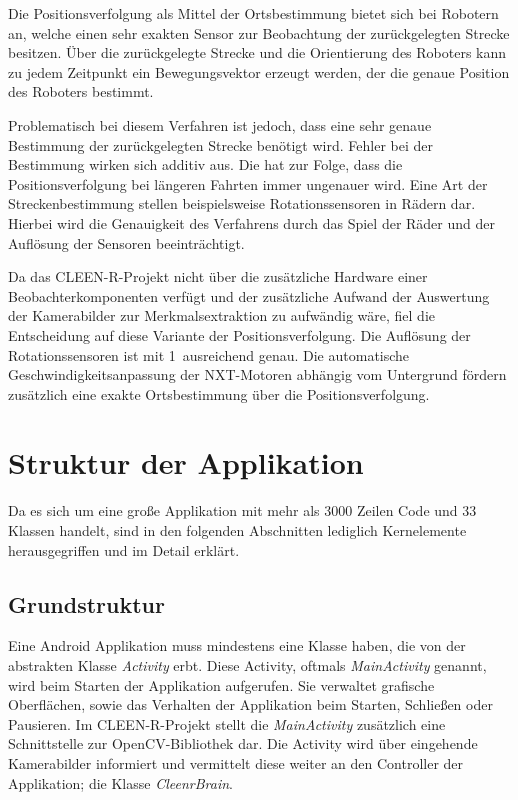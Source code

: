 Die Positionsverfolgung als Mittel der Ortsbestimmung bietet sich bei Robotern an, welche einen sehr exakten Sensor zur Beobachtung der zurückgelegten Strecke besitzen. Über die zurückgelegte Strecke und die Orientierung des Roboters kann zu jedem Zeitpunkt ein Bewegungsvektor erzeugt werden, der die genaue Position des Roboters bestimmt.

Problematisch bei diesem Verfahren ist jedoch, dass eine sehr genaue Bestimmung der zurückgelegten Strecke benötigt wird. Fehler bei der Bestimmung wirken sich additiv aus. Die hat zur Folge, dass die Positionsverfolgung bei längeren Fahrten immer ungenauer wird. Eine Art der Streckenbestimmung stellen beispielsweise Rotationssensoren in Rädern dar. Hierbei wird die Genauigkeit des Verfahrens durch das Spiel der Räder und der Auflösung der Sensoren beeinträchtigt.

Da das CLEEN-R-Projekt nicht über die zusätzliche Hardware einer Beobachterkomponenten verfügt und der zusätzliche Aufwand der Auswertung der Kamerabilder zur Merkmalsextraktion zu aufwändig wäre, fiel die Entscheidung auf diese Variante der Positionsverfolgung. Die Auflösung der Rotationssensoren ist mit 1\degree\ ausreichend genau. Die automatische Geschwindigkeitsanpassung der NXT-Motoren abhängig vom Untergrund fördern zusätzlich eine exakte Ortsbestimmung über die Positionsverfolgung.

\section{Struktur der Applikation}
Da es sich um eine große Applikation mit mehr als 3000 Zeilen Code und 33 Klassen handelt, sind in den folgenden Abschnitten lediglich Kernelemente herausgegriffen und im Detail erklärt.

\subsection{Grundstruktur}
Eine Android Applikation muss mindestens eine Klasse haben, die von der abstrakten Klasse \textit{Activity} erbt. Diese Activity, oftmals \textit{MainActivity} genannt, wird beim Starten der Applikation aufgerufen. Sie verwaltet grafische Oberflächen, sowie das Verhalten der Applikation beim Starten, Schließen oder Pausieren. Im CLEEN-R-Projekt stellt die \textit{MainActivity} zusätzlich eine Schnittstelle zur OpenCV-Bibliothek dar. Die Activity wird über eingehende Kamerabilder informiert und vermittelt diese weiter an den Controller der Applikation; die Klasse \textit{CleenrBrain}.

